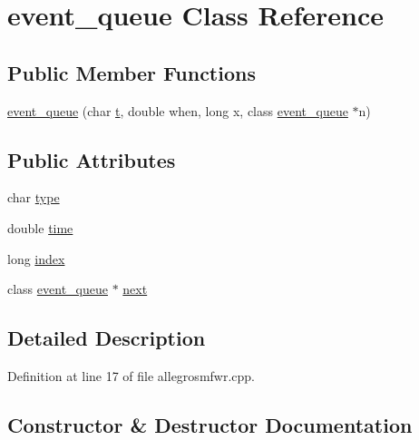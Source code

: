 \hypertarget{classevent__queue}{}\section{event\+\_\+queue Class Reference}
\label{classevent__queue}
\subsection*{Public Member Functions}
\begin{DoxyCompactItemize}
\item 
\hyperlink{classevent__queue_a6a110e368f3aed374b98506e3efcf193}{event\+\_\+queue} (char \hyperlink{octave__test_8m_aaccc9105df5383111407fd5b41255e23}{t}, double when, long x, class \hyperlink{classevent__queue}{event\+\_\+queue} $\ast$n)
\end{DoxyCompactItemize}
\subsection*{Public Attributes}
\begin{DoxyCompactItemize}
\item 
char \hyperlink{classevent__queue_ad7842184b429f4cad057ff2055aeabdb}{type}
\item 
double \hyperlink{classevent__queue_a191d4d31576748623f3a98818ca5e387}{time}
\item 
long \hyperlink{classevent__queue_a3b7d01b01a4bc728fd684a5c2090bb97}{index}
\item 
class \hyperlink{classevent__queue}{event\+\_\+queue} $\ast$ \hyperlink{classevent__queue_aad8a09e663fa9ec27fea821c473bb710}{next}
\end{DoxyCompactItemize}


\subsection{Detailed Description}


Definition at line 17 of file allegrosmfwr.\+cpp.



\subsection{Constructor \& Destructor Documentation}
